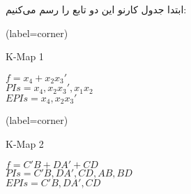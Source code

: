 ابتدا جدول کارنو این دو تابع را رسم می‌کنیم:


\begin{latin}
	\begin{minipage}{0.48\textwidth}
		\centering
		\begin{karnaugh-map}[4][4][1][$x_2$][$x_1$][$x_4$][$x_3$](label=corner)
		\end{karnaugh-map}
		\caption{K-Map 1}
		$f=x_4+x_2x_3'$\\
		$PIs=x_4, x_2x_3',x_1x_2$\\
		$EPIs=x_4, x_2x_3'$\\
	\end{minipage}
	\hfill
	\begin{minipage}{0.48\textwidth}
		\centering
		\begin{karnaugh-map}[4][4][1][$B$][$A$][$D$][$C$](label=corner)
		\end{karnaugh-map}
		\caption{K-Map 2}
		$f=C'B+DA'+CD$\\
		$PIs=C'B,DA',CD, AB, BD$\\
		$EPIs=C'B,DA',CD$\\
	\end{minipage}	
\end{latin}

